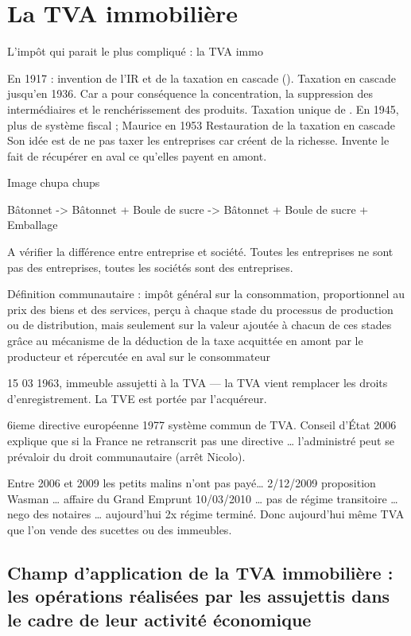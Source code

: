 \chapter{La TVA immobilière}

L’impôt qui parait le plus compliqué : la TVA immo


En 1917 : invention de l’IR et de la taxation en cascade (). Taxation en cascade jusqu’en 1936. Car a pour conséquence la concentration, la suppression des intermédiaires et le renchérissement des produits. Taxation unique de . En 1945, plus de système fiscal ; Maurice  en 1953 Restauration de la taxation en cascade Son idée est de ne pas taxer les entreprises car créent de la richesse. Invente le fait de récupérer en aval ce qu’elles payent en amont.


Image chupa chups


Bâtonnet -> Bâtonnet + Boule de sucre -> Bâtonnet + Boule de sucre + Emballage


A vérifier la différence entre entreprise et société. Toutes les entreprises ne sont pas des entreprises, toutes les sociétés sont des entreprises.


Définition communautaire : impôt général sur la consommation, proportionnel au prix des biens et des services, perçu à chaque stade du processus de production ou de distribution, mais seulement sur la valeur ajoutée à chacun de ces stades grâce au mécanisme de la déduction de la taxe acquittée en amont par le producteur et répercutée en aval sur le consommateur


15 03 1963, immeuble assujetti à la TVA --- la TVA vient remplacer les droits d’enregistrement. La TVE est portée par l’acquéreur.


6ieme directive européenne 1977 système commun de TVA. Conseil d’État 2006 explique que si la France ne retranscrit pas une directive … l’administré peut se prévaloir du droit communautaire (arrêt Nicolo).

Entre 2006 et 2009 les petits malins n’ont pas payé… 2/12/2009 proposition Wasman … affaire du Grand Emprunt 10/03/2010 … pas de régime transitoire … nego des notaires … aujourd’hui 2x régime terminé. Donc aujourd’hui même TVA que l’on vende des sucettes ou des immeubles.



\section{Champ d’application de la TVA immobilière : les opérations réalisées par les assujettis dans le cadre de leur activité économique}
	

